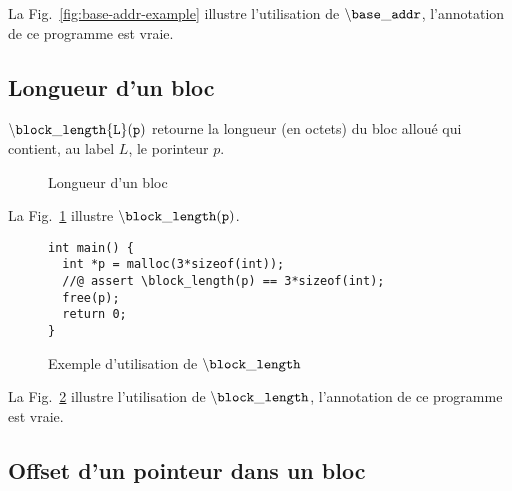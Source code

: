 La Fig.~\ref{fig:base-addr-example}
illustre l'utilisation de ${\tt \backslash base\_addr}$, l'annotation de ce
programme est vraie.


\subsection{Longueur d'un bloc}

${\tt \backslash block\_length\{L\}(p)}$ retourne la longueur (en octets) du
bloc alloué qui contient, au label $L$, le porinteur $p$. 


\begin{figure}[h]
  \begin{center}
  \end{center}
  \caption{Longueur d'un bloc}
  \label{fig:block-length}
\end{figure}

La Fig.~\ref{fig:block-length} illustre ${\tt \backslash block\_length(p)}$.

\begin{figure}[h]
\begin{lstlisting}
int main() {
  int *p = malloc(3*sizeof(int));
  //@ assert \block_length(p) == 3*sizeof(int);
  free(p);
  return 0;
}
\end{lstlisting}
\caption{Exemple d'utilisation de ${\tt \backslash block\_length}$}
\label{fig:block-length-example}
\end{figure}

La Fig.~\ref{fig:block-length-example} illustre l'utilisation de
${\tt \backslash block\_length}$, l'annotation de ce programme est vraie.


\subsection{Offset d'un pointeur dans un bloc}

